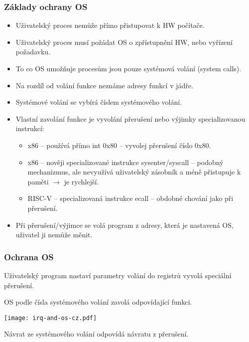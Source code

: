 \documentclass{beamer}
\begin{document}
\begin{frame}
\frametitle{Základy ochrany OS}

\begin{itemize}
\item Uživatelský proces nemůže přímo přistupovat k HW počítače.
\item Uživatelský proces musí požádat OS o zpřístupnění HW, nebo vyřízení požadavku.
\item To co OS umožňuje procesům jsou pouze systémová volání (system calls).
\item Na rozdíl od volání funkce neznáme adresy funkcí v jádře.
\item Systémové volání se vybírá číslem systémového volání.
\item Vlastní zavolání funkce je vyvolání přerušení nebo výjimky specializovanou instrukcí:
\begin{itemize}
\item x86 -- používá přímo int 0x80 -- vyvolej přerušení číslo 0x80.
\item x86 -- nověji specializované instrukce sysenter/syscall -- podobný mechanizmus, ale nevyužívá uživatelský zásobník a méně přistupuje k paměti $\rightarrow$ je rychlejší.
\item RISC-V -- specializovaná instrukce ecall -- obdobné chování jako při přerušení.
\end{itemize}
\item Při přerušení/výjimce se volá program z adresy, která je nastavená OS, uživatel ji nemůže měnit.
\end{itemize}
\end{frame}

\begin{frame}
\frametitle{Ochrana OS}

Uživatelský program nastaví parametry volání do registrů vyvolá speciální přerušení.

OS podle čísla systémového volání zavolá odpovídající funkci.

\begin{center}
  \texttt{[image: irq-and-os-cz.pdf]}
\end{center}

Návrat ze systémového volání odpovídá návratu z přerušení.
\end{frame}
\end{document}
